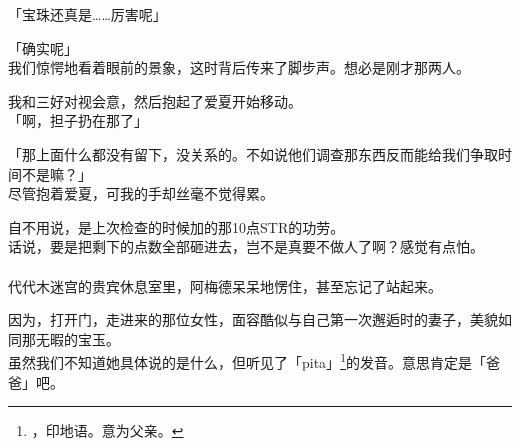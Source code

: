 「宝珠还真是……厉害呢」

「确实呢」\\

我们惊愕地看着眼前的景象，这时背后传来了脚步声。想必是刚才那两人。

我和三好对视会意，然后抱起了爱夏开始移动。\\

「啊，担子扔在那了」

「那上面什么都没有留下，没关系的。不如说他们调查那东西反而能给我们争取时间不是嘛？」\\

尽管抱着爱夏，可我的手却丝毫不觉得累。

自不用说，是上次检查的时候加的那10点STR的功劳。\\

话说，要是把剩下的点数全部砸进去，岂不是真要不做人了啊？感觉有点怕。\\

\sqsplit\\

代代木迷宫的贵宾休息室里，阿梅德呆呆地愣住，甚至忘记了站起来。

因为，打开门，走进来的那位女性，面容酷似与自己第一次邂逅时的妻子，美貌如同那无暇的宝玉。\\

虽然我们不知道她具体说的是什么，但听见了「pita」\footnote{，印地语。意为父亲。}的发音。意思肯定是「爸爸」吧。\\

